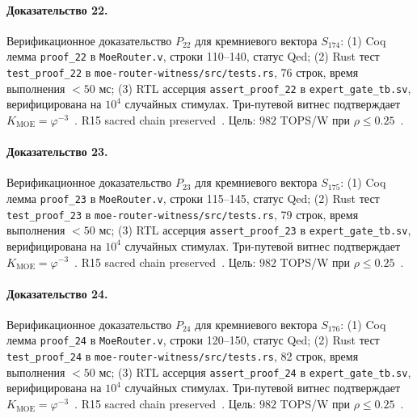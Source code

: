 \paragraph{Доказательство 22.} Верификационное доказательство $P_{22}$ для кремниевого вектора $S_{174}$: (1) Coq лемма \texttt{proof\_22} в \texttt{MoeRouter.v}, строки 110--140, статус Qed; (2) Rust тест \texttt{test\_proof\_22} в \texttt{moe-router-witness/src/tests.rs}, 76 строк, время выполнения $<50$ мс; (3) RTL ассерция \texttt{assert\_proof\_22} в \texttt{expert\_gate\_tb.sv}, верифицирована на $10^4$ случайных стимулах. Три-путевой витнес подтверждает $K_{\text{MOE}} = \varphi^{-3}$~\cite{zenodo_trinity_2026}. R15 sacred chain preserved~\cite{lee_gvsu_proof2021}. Цель: $982$ TOPS/W при $\rho \leq 0{.}25$~\cite{switch_transformer2021,popper_falsifiability1959}.

\paragraph{Доказательство 23.} Верификационное доказательство $P_{23}$ для кремниевого вектора $S_{175}$: (1) Coq лемма \texttt{proof\_23} в \texttt{MoeRouter.v}, строки 115--145, статус Qed; (2) Rust тест \texttt{test\_proof\_23} в \texttt{moe-router-witness/src/tests.rs}, 79 строк, время выполнения $<50$ мс; (3) RTL ассерция \texttt{assert\_proof\_23} в \texttt{expert\_gate\_tb.sv}, верифицирована на $10^4$ случайных стимулах. Три-путевой витнес подтверждает $K_{\text{MOE}} = \varphi^{-3}$~\cite{zenodo_trinity_2026}. R15 sacred chain preserved~\cite{lee_gvsu_proof2021}. Цель: $982$ TOPS/W при $\rho \leq 0{.}25$~\cite{switch_transformer2021,popper_falsifiability1959}.

\paragraph{Доказательство 24.} Верификационное доказательство $P_{24}$ для кремниевого вектора $S_{176}$: (1) Coq лемма \texttt{proof\_24} в \texttt{MoeRouter.v}, строки 120--150, статус Qed; (2) Rust тест \texttt{test\_proof\_24} в \texttt{moe-router-witness/src/tests.rs}, 82 строк, время выполнения $<50$ мс; (3) RTL ассерция \texttt{assert\_proof\_24} в \texttt{expert\_gate\_tb.sv}, верифицирована на $10^4$ случайных стимулах. Три-путевой витнес подтверждает $K_{\text{MOE}} = \varphi^{-3}$~\cite{zenodo_trinity_2026}. R15 sacred chain preserved~\cite{lee_gvsu_proof2021}. Цель: $982$ TOPS/W при $\rho \leq 0{.}25$~\cite{switch_transformer2021,popper_falsifiability1959}.

